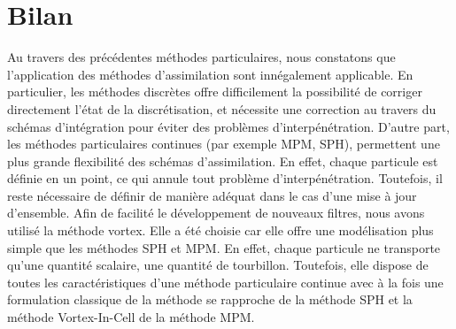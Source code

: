 
\section{Bilan}

Au travers des précédentes méthodes particulaires, nous constatons que l'application des méthodes d'assimilation sont innégalement applicable. En particulier, les méthodes discrètes offre difficilement la possibilité de corriger directement l'état de la discrétisation, et nécessite une correction au travers du schémas d'intégration pour éviter des problèmes d'interpénétration. D'autre part, les méthodes particulaires continues (par exemple MPM, SPH), permettent une plus grande flexibilité des schémas d'assimilation. En effet, chaque particule est définie en un point, ce qui annule tout problème d'interpénétration. Toutefois, il reste nécessaire de définir de manière adéquat dans le cas d'une mise à jour d'ensemble.
Afin de facilité le développement de nouveaux filtres, nous avons utilisé la méthode vortex. Elle a été choisie car elle offre une modélisation plus simple que les méthodes SPH et MPM. En effet, chaque particule ne transporte qu'une quantité scalaire, une quantité de tourbillon. Toutefois, elle dispose de toutes les caractéristiques d'une méthode particulaire continue avec à la fois une formulation classique de la méthode se rapproche de la méthode SPH et la méthode Vortex-In-Cell de la méthode MPM.
